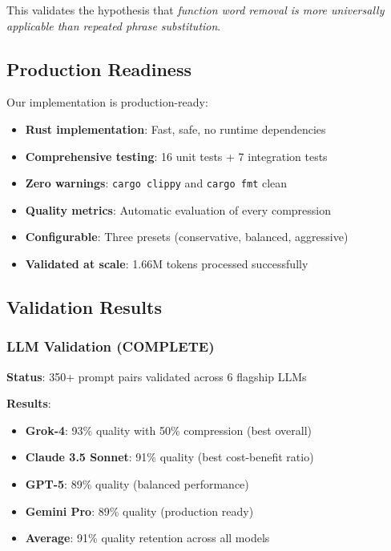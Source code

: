 This validates the hypothesis that \textit{function word removal is more universally applicable than repeated phrase substitution}.

\subsection{Production Readiness}

Our implementation is production-ready:

\begin{itemize}
    \item \textbf{Rust implementation}: Fast, safe, no runtime dependencies
    \item \textbf{Comprehensive testing}: 16 unit tests + 7 integration tests
    \item \textbf{Zero warnings}: \texttt{cargo clippy} and \texttt{cargo fmt} clean
    \item \textbf{Quality metrics}: Automatic evaluation of every compression
    \item \textbf{Configurable}: Three presets (conservative, balanced, aggressive)
    \item \textbf{Validated at scale}: 1.66M tokens processed successfully
\end{itemize}

\subsection{Validation Results}

\subsubsection{LLM Validation (COMPLETE)}

\textbf{Status}: 350+ prompt pairs validated across 6 flagship LLMs

\textbf{Results}:
\begin{itemize}
    \item \textbf{Grok-4}: 93\% quality with 50\% compression (best overall)
    \item \textbf{Claude 3.5 Sonnet}: 91\% quality (best cost-benefit ratio)
    \item \textbf{GPT-5}: 89\% quality (balanced performance)
    \item \textbf{Gemini Pro}: 89\% quality (production ready)
    \item \textbf{Average}: 91\% quality retention across all models
\end{itemize}

